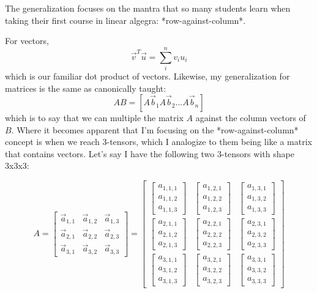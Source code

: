 The generalization focuses on the mantra that so many students learn when taking their first course in linear algegra: *row-against-column*.

For vectors,
$$\vec{v}^T \vec{u} = \sum_i^n v_iu_i$$
which is our familiar dot product of vectors. Likewise, my generalization for matrices is the same as canonically taught:
$$AB = [A\vec{b}_1 A\vec{b}_2 ... A\vec{b}_n]$$
which is to say that we can multiple the matrix $A$  against the column vectors of $B$. Where it becomes apparent that I'm focusing on the *row-against-column* concept is when we reach 3-tensors, which I analogize to them being like a matrix that contains vectors. Let's say I have the following two 3-tensors with shape 3x3x3:

$$A = \begin{bmatrix}
\vec{a}_{1,1} & \vec{a}_{1,2} & \vec{a}_{1,3}\\
\vec{a}_{2,1} & \vec{a}_{2,2} & \vec{a}_{2,3}\\
\vec{a}_{3,1} & \vec{a}_{3,2} & \vec{a}_{3,3}
\end{bmatrix} 
= 
\begin{bmatrix}
\begin{bmatrix}a_{1,1,1} \\ a_{1,1,2} \\ a_{1,1,3} \end{bmatrix} & \begin{bmatrix}a_{1,2,1} \\ a_{1,2,2} \\ a_{1,2,3} \end{bmatrix} & \begin{bmatrix}a_{1,3,1} \\ a_{1,3,2} \\ a_{1,3,3}\end{bmatrix}\\
\begin{bmatrix}a_{2,1,1} \\ a_{2,1,2} \\ a_{2,1,3} \end{bmatrix} & \begin{bmatrix}a_{2,2,1} \\ a_{2,2,2} \\ a_{2,2,3} \end{bmatrix} & \begin{bmatrix}a_{2,3,1} \\ a_{2,3,2} \\ a_{2,3,3}\end{bmatrix}\\
\begin{bmatrix}a_{3,1,1} \\ a_{3,1,2} \\ a_{3,1,3} \end{bmatrix} & \begin{bmatrix}a_{3,2,1} \\ a_{3,2,2} \\ a_{3,2,3} \end{bmatrix} & \begin{bmatrix}a_{3,3,1} \\ a_{3,3,2} \\ a_{3,3,3}\end{bmatrix}
\end{bmatrix}$$


